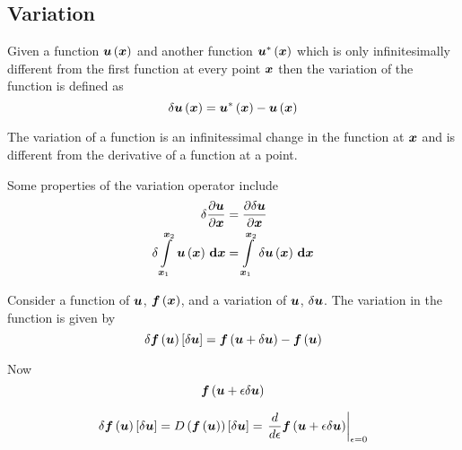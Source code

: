 \subsection{Variation}
\label{subsec:VariationOperator}

Given a function $ \boldsymbol{u}\left( \boldsymbol{x} \right) $  and another function
$ \boldsymbol{u}^{*}\left( \boldsymbol{x} \right) $ which is only infinitesimally different from
the first function at every point $\boldsymbol{x}$ then the variation of the
function is defined as
\begin{equation}
     \delta  \boldsymbol{u} \left( \boldsymbol{x} \right) = \boldsymbol{u}^{*}\left( \boldsymbol{x} \right) - \boldsymbol{u}\left( \boldsymbol{x} \right) 
\end{equation}

The variation of a function is an infinitessimal change in the function at
$\boldsymbol{x}$ and is different from the derivative of a function at a point.

Some properties of the variation operator include
\begin{equation}
  \begin{split}
      \delta   \dfrac{\partial \boldsymbol{u}}{\partial \boldsymbol{x}}  &= \dfrac{\partial   \delta  \boldsymbol{u} }{\partial \boldsymbol{x}}  \\
      \delta    \displaystyle\int\limits_{\boldsymbol{x}_{1}}^{\boldsymbol{x}_{2}} \, \boldsymbol{u}\left( \boldsymbol{x} \right) \, \boldsymbol{\mathrm{d}} \boldsymbol{x}  &=  \displaystyle\int\limits_{\boldsymbol{x}_{1}}^{\boldsymbol{x}_{2}} \,  \delta   \boldsymbol{u}\left( \boldsymbol{x} \right)  \, \boldsymbol{\mathrm{d}} \boldsymbol{x}  
  \end{split}
\end{equation}

Consider a function of $\boldsymbol{u}$, $ \boldsymbol{f}\left( \boldsymbol{x} \right) $, and a
variation of $\boldsymbol{u}$, $  \delta  \boldsymbol{u} $. The variation in the
function is given by
\begin{equation}
     \delta   \boldsymbol{f}\left( \boldsymbol{u} \right) \left[   \delta  \boldsymbol{u}  \right]  = \boldsymbol{f}\left( \boldsymbol{u}+  \delta  \boldsymbol{u}  \right) - \boldsymbol{f}\left( \boldsymbol{u} \right) 
\end{equation}

Now
\begin{equation}
   \boldsymbol{f}\left( \boldsymbol{u}+\epsilon  \delta  \boldsymbol{u}  \right) 
\end{equation}

\begin{equation}
  \variation{\fnof{\vectr{f}}{\vectr{u}}}{\vectr{u}}=\directionalderiv{}{\fnof{\vectr{f}}{\vectr{u}}}{\variationdir{\vectr{u}}}=\evalat{\dby{}{\epsilon}\fnof{\vectr{f}}{\vectr{u}+\epsilon\variationdir{\vectr{u}}}}{\epsilon=0}
\end{equation}
  
